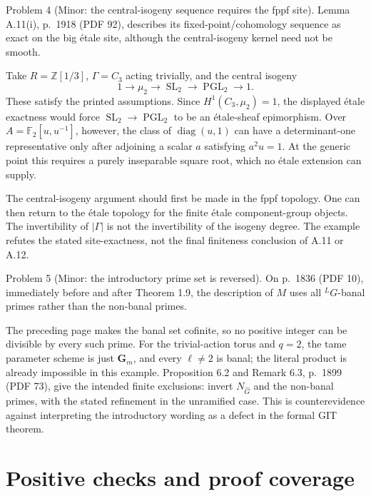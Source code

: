 \documentclass[10pt]{article}
\begin{document}
Problem 4 (Minor: the central-isogeny sequence requires the fppf site).  Lemma A.11(i), p. 1918 (PDF 92), describes its fixed-point/cohomology sequence as exact on the big étale site, although the central-isogeny kernel need not be smooth.\par
Take \(R=\mathbb Z[1/3]\), \(\Gamma=C_3\) acting trivially, and the central isogeny \[1\longrightarrow\mu_2\longrightarrow\operatorname{SL}_2\longrightarrow\operatorname{PGL}_2
 \longrightarrow1.\] These satisfy the printed assumptions. Since \(H^1(C_3,\mu_2)=1\), the displayed étale exactness would force \(\operatorname{SL}_2\to\operatorname{PGL}_2\) to be an étale-sheaf epimorphism. Over \(A=\mathbb F_2[u,u^{-1}]\), however, the class of \(\operatorname{diag}(u,1)\) can have a determinant-one representative only after adjoining a scalar \(a\) satisfying \(a^2u=1\). At the generic point this requires a purely inseparable square root, which no étale extension can supply.\par
The central-isogeny argument should first be made in the fppf topology. One can then return to the étale topology for the finite étale component-group objects. The invertibility of \(|\Gamma|\) is not the invertibility of the isogeny degree. The example refutes the stated site-exactness, not the final finiteness conclusion of A.11 or A.12.\par
Problem 5 (Minor: the introductory prime set is reversed).  On p. 1836 (PDF 10), immediately before and after Theorem 1.9, the description of \(M\) uses all \(^{L}G\)-banal primes rather than the non-banal primes.\par
The preceding page makes the banal set cofinite, so no positive integer can be divisible by every such prime. For the trivial-action torus and \(q=2\), the tame parameter scheme is just \(\mathbf G_m\), and every \(\ell\ne2\) is banal; the literal product is already impossible in this example. Proposition 6.2 and Remark 6.3, p. 1899 (PDF 73), give the intended finite exclusions: invert \(N_{\widehat G}\) and the non-banal primes, with the stated refinement in the unramified case. This is counterevidence against interpreting the introductory wording as a defect in the formal GIT theorem.\par
\section*{Positive checks and proof coverage}
\end{document}
